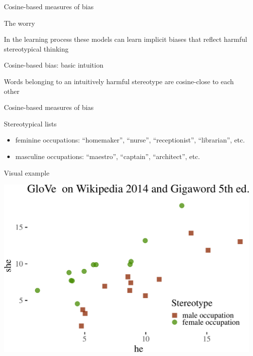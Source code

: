 \documentclass[10pt,ignorenonframetext,x11names, dvipsnames, bibspacing,natbib]{beamer}
\begin{document}
\begin{frame}{Cosine-based measures of bias}

\begin{block}{The worry}

In the learning process these models can learn implicit biases that
reflect harmful stereotypical thinking

\pause

\end{block}

\begin{block}{Cosine-based bias: basic intuition}

Words belonging to an intuitively harmful stereotype are cosine-close to
each other

\end{block}

\end{frame}

\begin{frame}{Cosine-based measures of bias}

\begin{block}{Stereotypical lists}

\footnotesize 

\begin{itemize}
\item
  feminine occupations: ``homemaker'', ``nurse'', ``receptionist'',
  ``librarian'', etc.
\item
  masculine occupations: ``maestro'', ``captain'', ``architect'', etc.
\end{itemize}

\normalsize 

\end{block}

\begin{block}{Visual example}

\vspace{1mm} \footnotesize

\begin{center}\includegraphics[width=0.6\linewidth]{presentationESSLLI_files/figure-beamer/unnamed-chunk-1-1} \end{center}

\normalsize

\end{block}

\end{frame}
\end{document}
